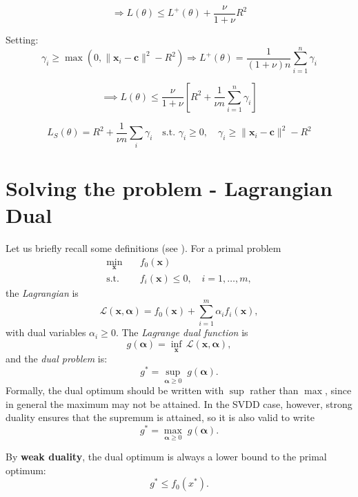 \documentclass[11pt]{report}
\begin{document}
\[
\Rightarrow L(\theta) \leq L^+(\theta) + \frac{\nu}{1+\nu} R^2
\]


Setting:
\[
\gamma_i \geq \max(0, \|\boldsymbol{x}_i - \boldsymbol{c}\|^2 - R^2)
\Rightarrow
L^+(\theta) = \frac{1}{(1+\nu)n}\sum _{i=1} ^n \gamma_i
\]

\[
\implies L(\theta) \leq \frac{\nu}{1+\nu}\left[ R^2 + \frac{1}{\nu n} \sum_{i=1}^n \gamma_i \right]
\]

\[
L_S(\theta) = R^2 + \frac{1}{\nu n} \sum_i \gamma_i \quad \text{s.t. } \gamma_i \geq 0,\quad \gamma_i \geq \|\boldsymbol{x}_i - \boldsymbol{c}\|^2 - R^2
\]

\section{Solving the problem - Lagrangian Dual}
Let us briefly recall some definitions (see \cite[Ch.~5]{boyd2004convex}).  
For a primal problem
\begin{align*}
\min_{\mathbf{x}} \quad & f_0(\mathbf{x}) \\
\text{s.t.} \quad & f_i(\mathbf{x}) \leq 0, \quad i=1,\dots,m,
\end{align*}
the \emph{Lagrangian} is
\[
\mathcal{L}(\mathbf{x}, \boldsymbol{\alpha}) = f_0(\mathbf{x}) + \sum_{i=1}^m \alpha_i f_i(\mathbf{x}),
\]
with dual variables $\alpha_i \geq 0$.  
The \emph{Lagrange dual function} is
\[
g(\boldsymbol{\alpha}) = \inf_{\mathbf{x}} \, \mathcal{L}(\mathbf{x}, \boldsymbol{\alpha}),
\]
and the \emph{dual problem} is:
\[
g^* = \sup_{\boldsymbol{\alpha} \ge 0} \; g(\boldsymbol{\alpha}).
\]
Formally, the dual optimum should be written with $\sup$ rather than $\max$, 
since in general the maximum may not be attained. In the SVDD case, however, 
strong duality ensures that the supremum is attained, so it is also valid to write
\[
g^* = \max_{\boldsymbol{\alpha} \ge 0} \; g(\boldsymbol{\alpha}).
\]

By \textbf{weak duality}, the dual optimum is always a lower bound to the primal optimum:
\[
g^* \le f_0(x^*).
\]
\end{document}
